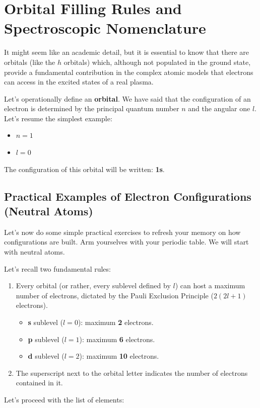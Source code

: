 \section{Orbital Filling Rules and Spectroscopic Nomenclature}

It might seem like an academic detail, but it is essential to know that there are orbitals (like the $h$ orbitals) which, although not populated in the ground state, provide a fundamental contribution in the complex atomic models that electrons can access in the excited states of a real plasma.

Let's operationally define an \textbf{orbital}. We have said that the configuration of an electron is determined by the principal quantum number $n$ and the angular one $l$.
Let's resume the simplest example:
\begin{itemize}
\item $n = 1$
\item $l = 0$
\end{itemize}
The configuration of this orbital will be written: \textbf{1s}.

\subsection{Practical Examples of Electron Configurations (Neutral Atoms)}

Let's now do some simple practical exercises to refresh your memory on how configurations are built. Arm yourselves with your periodic table. We will start with neutral atoms.

Let's recall two fundamental rules:
\begin{enumerate}
\item Every orbital (or rather, every sublevel defined by $l$) can host a maximum number of electrons, dictated by the Pauli Exclusion Principle ($2(2l+1)$ electrons).
\begin{itemize}
\item \textbf{s} sublevel ($l=0$): maximum \textbf{2} electrons.
\item \textbf{p} sublevel ($l=1$): maximum \textbf{6} electrons.
\item \textbf{d} sublevel ($l=2$): maximum \textbf{10} electrons.
\end{itemize}
\item The superscript next to the orbital letter indicates the number of electrons contained in it.
\end{enumerate}

Let's proceed with the list of elements:

